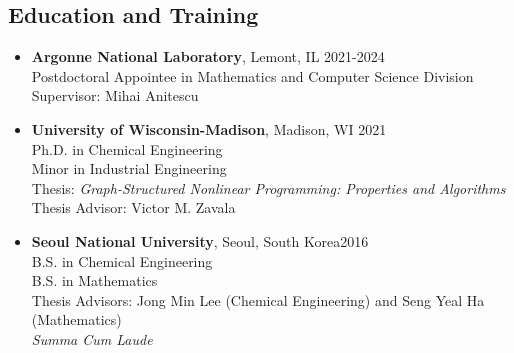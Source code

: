 \subsection*{Education and Training}
\begin{itemize}[itemsep=1pt, parsep=0pt,leftmargin=*]
\item[]
  {\bf Argonne National Laboratory}, Lemont, IL \hfill 2021-2024\\
  Postdoctoral Appointee in {Mathematics and Computer Science Division} \\
  Supervisor: Mihai Anitescu
\item[]
  {\bf University of Wisconsin-Madison}, Madison, WI \hfill 2021\\
  {Ph.D. in Chemical Engineering} \\
  {Minor in Industrial Engineering}\\
  Thesis: {\it Graph-Structured Nonlinear Programming: Properties and Algorithms}\\
  Thesis Advisor: Victor M. Zavala
\item[]
  {\bf Seoul National University}, Seoul, South Korea\hfill 2016 \\
  {B.S. in Chemical Engineering}\\
  {B.S. in Mathematics}\\
  Thesis Advisors: Jong Min Lee (Chemical Engineering) and Seng Yeal Ha (Mathematics)\\
  {\it Summa Cum Laude}
\end{itemize}
